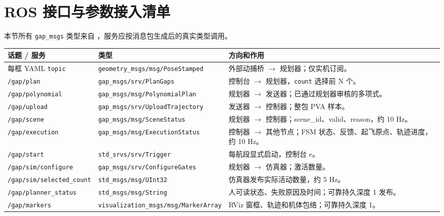 \documentclass[UTF8,fontset=fandol,a4paper,10pt]{ctexart}
\newcommand{\code}[1]{{\small\nolinkurl{#1}}}
\newcommand{\file}[1]{{\small\path{#1}}}
\begin{document}
\section{ROS 接口与参数接入清单}
本节所有 \code{gap_msgs} 类型来自 \file{src/utils/gap_msgs/}，服务应按消息包生成后的真实类型调用。
\begin{longtable}{@{}p{45mm}p{44mm}p{69mm}@{}}
\toprule 话题 / 服务 & 类型 & 方向和作用\\\midrule\endhead
每框 YAML \code{topic} & \code{geometry_msgs/msg/PoseStamped} & 外部动捕桥 $\to$ 规划器；仅实机订阅。\\
\code{/gap/plan} & \code{gap_msgs/srv/PlanGaps} & 控制台 $\to$ 规划器，\code{count} 选择前 N 个。\\
\code{/gap/polynomial} & \code{gap_msgs/msg/PolynomialPlan} & 规划器 $\to$ 发送器；已通过规划器审核的多项式。\\
\code{/gap/upload} & \code{gap_msgs/srv/UploadTrajectory} & 发送器 $\to$ 控制器；整包 PVA 样本。\\
\code{/gap/scene} & \code{gap_msgs/msg/SceneStatus} & 规划器 $\to$ 控制器；scene\_id、valid、reason，约 10 Hz。\\
\code{/gap/execution} & \code{gap_msgs/msg/ExecutionStatus} & 控制器 $\to$ 其他节点；FSM 状态、反馈、起飞原点、轨迹进度，约 10 Hz。\\
\code{/gap/start} & \code{std_srvs/srv/Trigger} & 每航段显式启动，控制台 e。\\
\code{/gap/sim/configure} & \code{gap_msgs/srv/ConfigureGates} & 规划器 $\to$ 仿真器；激活数量。\\
\code{/gap/sim/selected_count} & \code{std_msgs/msg/UInt32} & 仿真器发布实际活动数量，约 5 Hz。\\
\code{/gap/planner_status} & \code{std_msgs/msg/String} & 人可读状态、失败原因及时间；可靠持久深度 1 发布。\\
\code{/gap/markers} & \code{visualization_msgs/msg/MarkerArray} & RViz 窗框、轨迹和机体包络；可靠持久深度 1。\\\bottomrule
\end{longtable}
\end{document}
